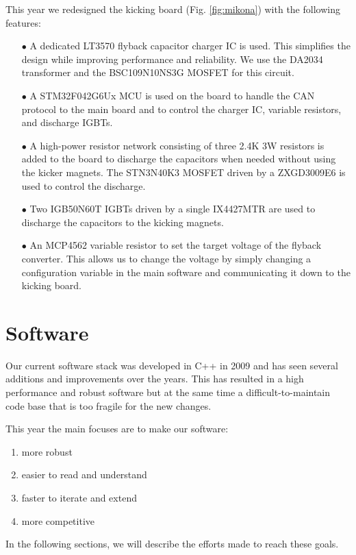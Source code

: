 \documentclass[runningheads]{llncs}
\begin{document}
This year we redesigned the kicking board (Fig. \ref{fig:mikona}) with the following features:
\begin{enumerate}
    \item[$\bullet$] A dedicated LT3570 flyback capacitor charger IC is used. This simplifies the design while improving performance and reliability. We use the DA2034 transformer and the BSC109N10NS3G MOSFET for this circuit.
    \item[$\bullet$] A STM32F042G6Ux MCU is used on the board to handle the CAN protocol to the main board and to control the charger IC, variable resistors, and discharge IGBTs.
    \item[$\bullet$] A high-power resistor network consisting of three 2.4K 3W resistors is added to the board to discharge the capacitors when needed without using the kicker magnets. The STN3N40K3 MOSFET driven by a ZXGD3009E6 is used to control the discharge.
    \item[$\bullet$] Two IGB50N60T IGBTs driven by a single IX4427MTR are used to discharge the capacitors to the kicking magnets.
    \item[$\bullet$] An MCP4562 variable resistor to set the target voltage of the flyback converter. This allows us to change the voltage by simply changing a configuration variable in the main software and communicating it down to the kicking board.
\end{enumerate}

\section{Software}
Our current software stack was developed in C++ in 2009 and has seen several additions and improvements over the years. This has resulted in a high performance and robust software but at the same time a difficult-to-maintain code base that is too fragile for the new changes.

This year the main focuses are to make our software:

\begin{enumerate}
    \item more robust
    \item easier to read and understand
    \item faster to iterate and extend
    \item more competitive
\end{enumerate}
In the following sections, we will describe the efforts made to reach these goals.
\end{document}
